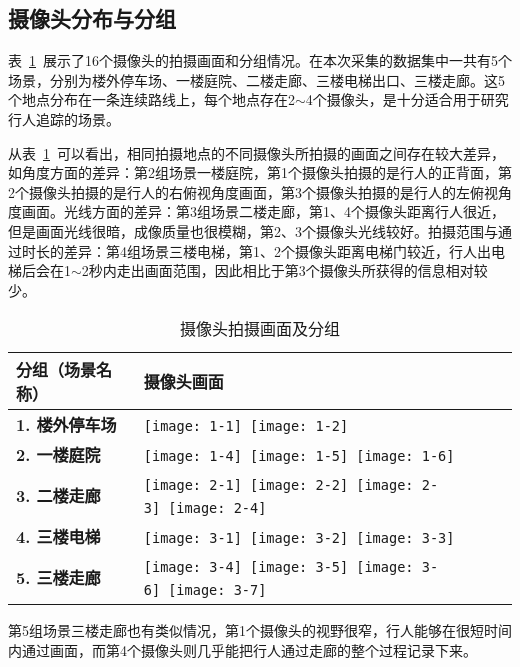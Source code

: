 \subsection{摄像头分布与分组}

表~\ref{tab:cameraslayout}~展示了16个摄像头的拍摄画面和分组情况。在本次采集的数据集中一共有5个场景，分别为楼外停车场、一楼庭院、二楼走廊、三楼电梯出口、三楼走廊。这5个地点分布在一条连续路线上，每个地点存在2$\sim$4个摄像头，是十分适合用于研究行人追踪的场景。

从表~\ref{tab:cameraslayout}~可以看出，相同拍摄地点的不同摄像头所拍摄的画面之间存在较大差异，如角度方面的差异：第2组场景一楼庭院，第1个摄像头拍摄的是行人的正背面，第2个摄像头拍摄的是行人的右俯视角度画面，第3个摄像头拍摄的是行人的左俯视角度画面。光线方面的差异：第3组场景二楼走廊，第1、4个摄像头距离行人很近，但是画面光线很暗，成像质量也很模糊，第2、3个摄像头光线较好。拍摄范围与通过时长的差异：第4组场景三楼电梯，第1、2个摄像头距离电梯门较近，行人出电梯后会在1$\sim$2秒内走出画面范围，因此相比于第3个摄像头所获得的信息相对较少。

\begin{table}[!ht]
\centering
\caption{摄像头拍摄画面及分组}
\label{tab:cameraslayout}
\renewcommand{\arraystretch}{1.5}%
\begin{tabularx}{\textwidth}{>{\centering\bfseries}m{} >{\centering\arraybackslash}m{}}
\toprule
分组（场景名称） & \textbf{摄像头画面} \\
\midrule
1. 楼外停车场 & \texttt{[image: 1-1]}~\texttt{[image: 1-2]} \\
2. 一楼庭院 & \texttt{[image: 1-4]}~\texttt{[image: 1-5]}~\texttt{[image: 1-6]} \\
3. 二楼走廊 & \texttt{[image: 2-1]}~\texttt{[image: 2-2]}~\texttt{[image: 2-3]}~\texttt{[image: 2-4]} \\
4. 三楼电梯 & \texttt{[image: 3-1]}~\texttt{[image: 3-2]}~\texttt{[image: 3-3]} \\
5. 三楼走廊 & \texttt{[image: 3-4]}~\texttt{[image: 3-5]}~\texttt{[image: 3-6]}~\texttt{[image: 3-7]} \\
\bottomrule
\end{tabularx}
\end{table}

第5组场景三楼走廊也有类似情况，第1个摄像头的视野很窄，行人能够在很短时间内通过画面，而第4个摄像头则几乎能把行人通过走廊的整个过程记录下来。

